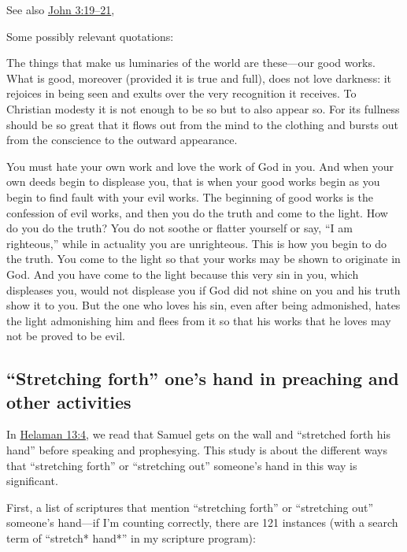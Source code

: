 	See also \hyperref[JOHN-3-19]{John 3:19--21}, 
	
	Some possibly relevant quotations:
	
		\begin{compactdesc}
			\item[Tertullian, ACCS NT 04a 130] The things that make us luminaries of the world are these---our good works. What is good, moreover (provided it is true and full), does not love darkness: it rejoices in being seen and exults over the very recognition it receives. To Christian modesty it is not enough to be so but to also appear so. For its fullness should be so great that it flows out from the mind to the clothing and bursts out from the conscience to the outward appearance.
			\item[Augustine, ACCS NT 04a 130] You must hate your own work and love the work of God in you. And when your own deeds begin to displease you, that is when your good works begin as you begin to find fault with your evil works. The beginning of good works is the confession of evil works, and then you do the truth and come to the light. How do you do the truth? You do not soothe or flatter yourself or say, ``I am righteous,'' while in actuality you are unrighteous. This is how you begin to do the truth. You come to the light so that your works may be shown to originate in God. And you have come to the light because this very sin in you, which displeases you, would not displease you if God did not shine on you and his truth show it to you. But the one who loves his sin, even after being admonished, hates the light admonishing him and flees from it so that his works that he loves may not be proved to be evil. 
		\end{compactdesc}
		
	\subsection{``Stretching forth'' one's hand in preaching and other activities}
		\label{EXSS-BOM-STRETCH-FORTH}
		
		In \hyperref[HELAMAN-13-4]{Helaman 13:4}, we read that Samuel gets on the wall and ``stretched forth his hand'' before speaking and prophesying. This study is about the different ways that ``stretching forth'' or ``stretching out'' someone's hand in this way is significant.
		
		First, a list of scriptures that mention ``stretching forth'' or ``stretching out'' someone's hand---if I'm counting correctly, there are 121 instances (with a search term of ``stretch* hand*'' in my scripture program):
		
